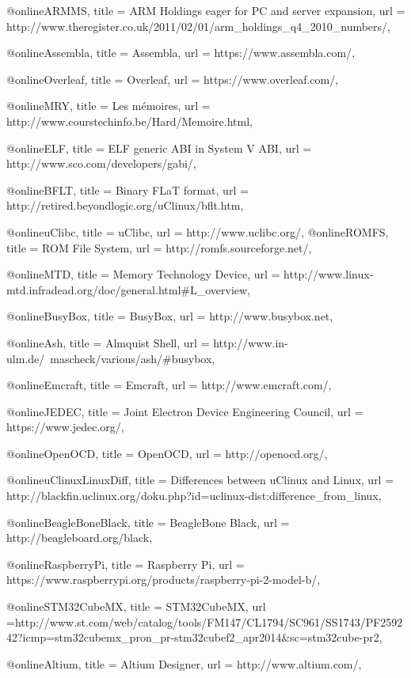 @online{ARMMS,
	title = {ARM Holdings eager for PC and server expansion},
	url = {http://www.theregister.co.uk/2011/02/01/arm_holdings_q4_2010_numbers/},
}

@online{Assembla,
	title = {Assembla},
	url = {https://www.assembla.com/},
}

@online{Overleaf,
	title = {Overleaf},
	url = {https://www.overleaf.com/},
}


@online{MRY,
	title = {Les mémoires},
	url = {http://www.courstechinfo.be/Hard/Memoire.html},
}

@online{ELF,
	title = {ELF generic ABI in System V ABI},
	url = {http://www.sco.com/developers/gabi/},
}

@online{BFLT,
	title = {Binary FLaT format},
	url = {http://retired.beyondlogic.org/uClinux/bflt.htm},
}

@online{uClibc,
	title = {uClibc},
	url = {http://www.uclibc.org/},
}
@online{ROMFS,
	title = {ROM File System},
	url = {http://romfs.sourceforge.net/},
}

@online{MTD,
	title = {Memory Technology Device},
	url = {http://www.linux-mtd.infradead.org/doc/general.html#L_overview},
}

@online{BusyBox,
	title = {BusyBox},
	url = {http://www.busybox.net},
}

@online{Ash,
	title = {Almquist Shell},
	url = {http://www.in-ulm.de/~mascheck/various/ash/#busybox},
}

@online{Emcraft,
	title = {Emcraft},
	url = {http://www.emcraft.com/},
}

@online{JEDEC,
	title = {Joint Electron Device Engineering Council},
	url = {https://www.jedec.org/},
}

@online{OpenOCD,
	title = {OpenOCD},
	url = {http://openocd.org/},
}

@online{uClinuxLinuxDiff,
	title = {Differences between uClinux and Linux},
	url = {http://blackfin.uclinux.org/doku.php?id=uclinux-dist:difference_from_linux},
}

@online{BeagleBoneBlack,
	title = {BeagleBone Black},
	url = {http://beagleboard.org/black},
}


@online{RaspberryPi,
	title = {Raspberry Pi},
	url = {https://www.raspberrypi.org/products/raspberry-pi-2-model-b/},
}

@online{STM32CubeMX,
	title = {STM32CubeMX},
	url  ={http://www.st.com/web/catalog/tools/FM147/CL1794/SC961/SS1743/PF259242?icmp=stm32cubemx_pron_pr-stm32cubef2_apr2014&sc=stm32cube-pr2},
}

@online{Altium,
	title = {Altium Designer},
	url = {http://www.altium.com/},
}

